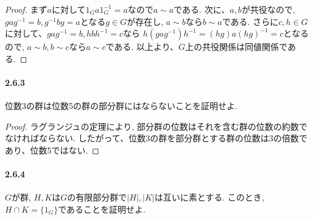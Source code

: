 \begin{proof}
	まず$a$に対して$1_G a 1_G^{-1}=a$なので$a\sim a$である.
	次に、$a,b$が共役なので, $gag^{-1} =b, g^{-1}bg=a$となる$g \in G$が存在し,
	$a\sim b$なら$b\sim a$である.
	さらに$c,h \in G$に対して、$gag^{-1}=b, hbh^{-1}=c$なら
	$h(gag^{-1})h^{-1}=(hg)a(hg)^{-1}=c$となるので,
	$a\sim b, b\sim c$なら$a\sim c$である.
	以上より、$G$上の共役関係は同値関係である.
\end{proof}

\paragraph{2.6.3} 位数3の群は位数5の群の部分群にはならないことを証明せよ.
\begin{proof}
	ラグランジュの定理により,
	部分群の位数はそれを含む群の位数の約数でなければならない.
	したがって、位数3の群を部分群とする群の位数は3の倍数であり、位数5ではない.
\end{proof}

\paragraph{2.6.4} $G$が群, $H,K$は$G$の有限部分群で$|H|,|K|$は互いに素とする.
このとき, $H\cap K=\{1_G\}$であることを証明せよ.
